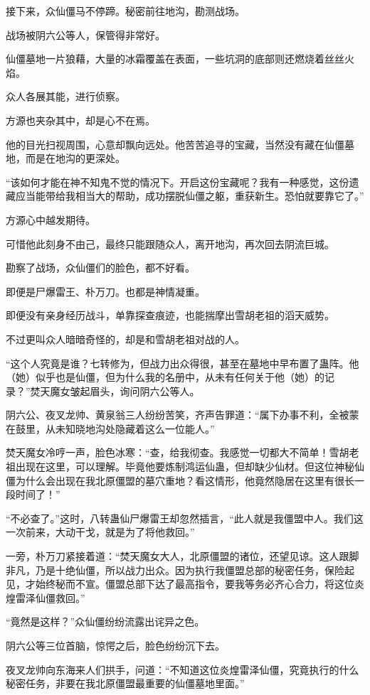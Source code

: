 \begin{this_body}
接下来，众仙僵马不停蹄。秘密前往地沟，勘测战场。

战场被阴六公等人，保管得非常好。

仙僵墓地一片狼藉，大量的冰霜覆盖在表面，一些坑洞的底部则还燃烧着丝丝火焰。

众人各展其能，进行侦察。

方源也夹杂其中，却是心不在焉。

他的目光扫视周围，心意却飘向远处。他苦苦追寻的宝藏，当然没有藏在仙僵墓地，而是在地沟的更深处。

“该如何才能在神不知鬼不觉的情况下。开启这份宝藏呢？我有一种感觉，这份遗藏应当能带给我相当大的帮助，成功摆脱仙僵之躯，重获新生。恐怕就要靠它了。”

方源心中越发期待。

可惜他此刻身不由己，最终只能跟随众人，离开地沟，再次回去阴流巨城。

勘察了战场，众仙僵们的脸色，都不好看。

即便是尸爆雷王、朴万刀。也都是神情凝重。

即便没有亲身经历战斗，单靠探查痕迹，也能揣摩出雪胡老祖的滔天威势。

不过更叫众人暗暗奇怪的，却是和雪胡老祖对战的人。

“这个人究竟是谁？七转修为，但战力出众得很，甚至在墓地中早布置了蛊阵。他（她）似乎也是仙僵，但为什么我的名册中，从未有任何关于他（她）的记录？”焚天魔女皱起眉头，询问阴六公等人。

阴六公、夜叉龙帅、黄泉翁三人纷纷苦笑，齐声告罪道：“属下办事不利，全被蒙在鼓里，从未知晓地沟处隐藏着这么一位能人。”

焚天魔女冷哼一声，脸色冰寒：“查，给我彻查。我感觉一切都大不简单！雪胡老祖出现在这里，可以理解。毕竟他要炼制鸿运仙蛊，但却缺少仙材。但这位神秘仙僵为什么会出现在我北原僵盟的墓穴重地？看这情形，他竟然隐居在这里有很长一段时间了！”

“不必查了。”这时，八转蛊仙尸爆雷王却忽然插言，“此人就是我僵盟中人。我们这一次前来，大动干戈，就是为了将他救回。”

一旁，朴万刀紧接着道：“焚天魔女大人，北原僵盟的诸位，还望见谅。这人跟脚非凡，乃是十绝仙僵，所以战力出众。因为执行我僵盟总部的秘密任务，保险起见，才始终秘而不宣。僵盟总部下达了最高指令，要我等务必齐心合力，将这位炎煌雷泽仙僵救回。”

“竟然是这样？”众仙僵纷纷流露出诧异之色。

阴六公等三位首脑，惊愕之后，脸色纷纷沉下去。

夜叉龙帅向东海来人们拱手，问道：“不知道这位炎煌雷泽仙僵，究竟执行的什么秘密任务，非要在我北原僵盟最重要的仙僵墓地里面。”


\end{this_body}
